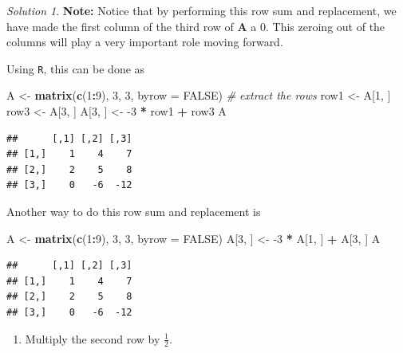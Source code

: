 \documentclass[
]{book}
\newenvironment{Shaded}{\begin{snugshade}}{\end{snugshade}}
\newcommand{\CommentTok}[1]{\textcolor[rgb]{0.56,0.35,0.01}{\textit{#1}}}
\newcommand{\DataTypeTok}[1]{\textcolor[rgb]{0.13,0.29,0.53}{#1}}
\newcommand{\DecValTok}[1]{\textcolor[rgb]{0.00,0.00,0.81}{#1}}
\newcommand{\KeywordTok}[1]{\textcolor[rgb]{0.13,0.29,0.53}{\textbf{#1}}}
\newcommand{\NormalTok}[1]{#1}
\newcommand{\OperatorTok}[1]{\textcolor[rgb]{0.81,0.36,0.00}{\textbf{#1}}}
\newcommand{\OtherTok}[1]{\textcolor[rgb]{0.56,0.35,0.01}{#1}}
\newcommand{\StringTok}[1]{\textcolor[rgb]{0.31,0.60,0.02}{#1}}
\providecommand{\tightlist}{%
  \setlength{\itemsep}{0pt}\setlength{\parskip}{0pt}}
\theoremstyle{definition}
\theoremstyle{definition}
\theoremstyle{definition}
\theoremstyle{definition}
\theoremstyle{remark}
\newtheorem*{solution}{Solution}
\begin{document}
\begin{solution}
\textbf{Note:} Notice that by performing this row sum and replacement, we have made the first column of the third row of \(\mathbf{A}\) a 0. This zeroing out of the columns will play a very important role moving forward.

Using \texttt{R}, this can be done as

\begin{Shaded}
\begin{Highlighting}[]
\NormalTok{A <-}\StringTok{ }\KeywordTok{matrix}\NormalTok{(}\KeywordTok{c}\NormalTok{(}\DecValTok{1}\OperatorTok{:}\DecValTok{9}\NormalTok{), }\DecValTok{3}\NormalTok{, }\DecValTok{3}\NormalTok{, }\DataTypeTok{byrow =} \OtherTok{FALSE}\NormalTok{)}
\CommentTok{# extract the rows }
\NormalTok{row1 <-}\StringTok{ }\NormalTok{A[}\DecValTok{1}\NormalTok{, ]}
\NormalTok{row3 <-}\StringTok{ }\NormalTok{A[}\DecValTok{3}\NormalTok{, ]}
\NormalTok{A[}\DecValTok{3}\NormalTok{, ] <-}\StringTok{ }\DecValTok{-3} \OperatorTok{*}\StringTok{ }\NormalTok{row1 }\OperatorTok{+}\StringTok{ }\NormalTok{row3}
\NormalTok{A}
\end{Highlighting}
\end{Shaded}

\begin{verbatim}
##      [,1] [,2] [,3]
## [1,]    1    4    7
## [2,]    2    5    8
## [3,]    0   -6  -12
\end{verbatim}

Another way to do this row sum and replacement is

\begin{Shaded}
\begin{Highlighting}[]
\NormalTok{A <-}\StringTok{ }\KeywordTok{matrix}\NormalTok{(}\KeywordTok{c}\NormalTok{(}\DecValTok{1}\OperatorTok{:}\DecValTok{9}\NormalTok{), }\DecValTok{3}\NormalTok{, }\DecValTok{3}\NormalTok{, }\DataTypeTok{byrow =} \OtherTok{FALSE}\NormalTok{)}
\NormalTok{A[}\DecValTok{3}\NormalTok{, ] <-}\StringTok{ }\DecValTok{-3} \OperatorTok{*}\StringTok{ }\NormalTok{A[}\DecValTok{1}\NormalTok{, ] }\OperatorTok{+}\StringTok{ }\NormalTok{A[}\DecValTok{3}\NormalTok{, ]}
\NormalTok{A}
\end{Highlighting}
\end{Shaded}

\begin{verbatim}
##      [,1] [,2] [,3]
## [1,]    1    4    7
## [2,]    2    5    8
## [3,]    0   -6  -12
\end{verbatim}

\begin{enumerate}
\def\labelenumi{\arabic{enumi})}
\setcounter{enumi}{2}
\tightlist
\item
  Multiply the second row by \(\frac{1}{2}\).
\end{enumerate}


\end{solution}
\end{document}
